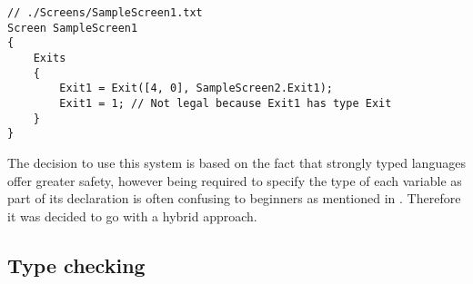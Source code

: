 \begin{lstlisting}[caption={Example of an illegal assingment}, label={lst:IllegalAssignment},escapechar=|]
// ./Screens/SampleScreen1.txt
Screen SampleScreen1 
{
	Exits 
	{
		Exit1 = Exit([4, 0], SampleScreen2.Exit1);
		Exit1 = 1; // Not legal because Exit1 has type Exit
	}
}
\end{lstlisting}

The decision to use this system is based on the fact that strongly typed languages offer greater safety, however being required to
specify the type of each variable as part of its declaration is often confusing to beginners as mentioned in .
Therefore it was decided to go with a hybrid approach.

\subsection*{Type checking}

